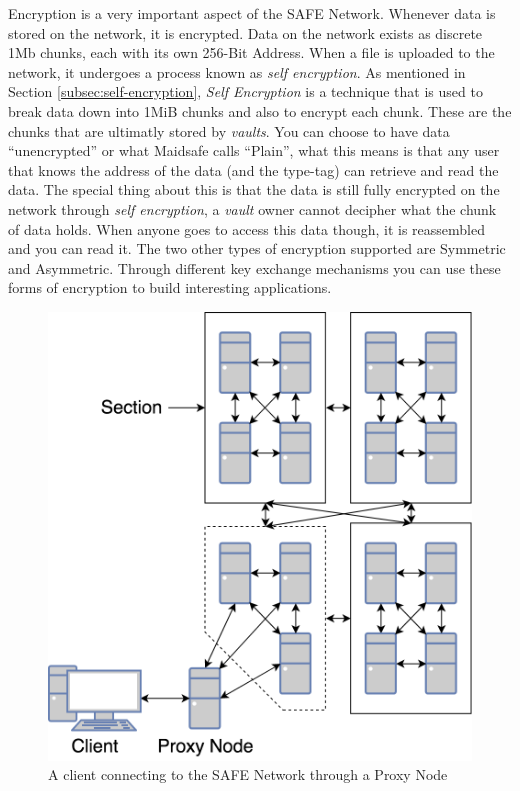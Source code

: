 Encryption is a very important aspect of the SAFE Network. Whenever data is stored on the network, it is encrypted. Data on the network exists as discrete 1Mb chunks, each with its own 256-Bit Address. When a file is uploaded to the network, it undergoes a process known as \textit{self encryption}. As mentioned in Section \ref{subsec:self-encryption}, \textit{Self Encryption} is a technique that is used to break data down into 1MiB chunks and also to encrypt each chunk. These are the chunks that are ultimatly stored by \textit{vaults}. You can choose to have data ``unencrypted'' or what Maidsafe calls ``Plain'', what this means is that any user that knows the address of the data (and the type-tag) can retrieve and read the data. The special thing about this is that the data is still fully encrypted on the network through \textit{self encryption}, a \textit{vault} owner cannot decipher what the chunk of data holds. When anyone goes to access this data though, it is reassembled and you can read it. The two other types of encryption supported are Symmetric and Asymmetric. Through different key exchange mechanisms you can use these forms of encryption to build interesting applications.

\begin{figure}
	\begin{center}
		\includegraphics[scale=0.3]{diagrams/safe-network-connection}
		\caption{A client connecting to the SAFE Network through a Proxy Node}
		\label{fig:proxy-connection}
	\end{center}
\end{figure}

